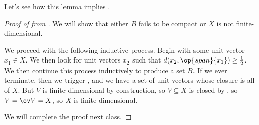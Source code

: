 \documentclass[../notes.tex]{subfiles}
\begin{document}
Let's see how this lemma implies .
\begin{proof}[Proof of  from ]
	We will show that either $B$ fails to be compact or $X$ is not finite-dimensional.

	We proceed with the following inductive process. Begin with some unit vector $x_1\in X$. We then look for unit vectors $x_2$ such that $d(x_2,\op{span}\{x_1\})\ge\frac12$. We then continue this process inductively to produce a set $B$. If we ever terminate, then we trigger , and we have a set of unit vectors whose closure is all of $X$. But $V$ is finite-dimensional by construction, so $V\subseteq X$ is closed by , so $V=\ov V=X$, so $X$ is finite-dimensional.

	We will complete the proof next class.
\end{proof}
\end{document}

